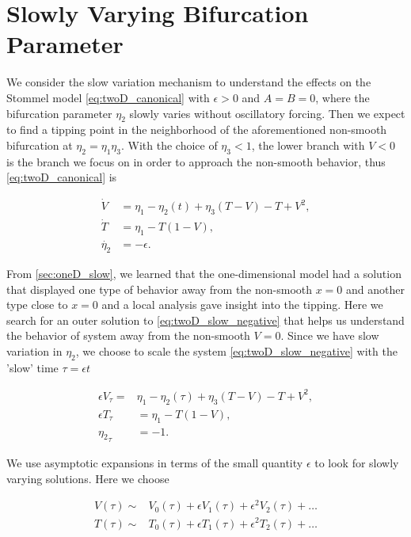 \section{Slowly Varying Bifurcation Parameter}
\label{sec:twoD_slow}

We consider the slow variation mechanism to understand the effects on the Stommel model \eqref{eq:twoD_canonical} with $\epsilon>0$ and $A=B=0$, where the bifurcation parameter $\eta_2$ slowly varies without oscillatory forcing. Then we expect to find a tipping point in the neighborhood of the aforementioned non-smooth bifurcation at $\eta_2=\eta_1\eta_3$. With the choice of $\eta_3<1$, the lower branch with $V<0$ is the branch we focus on in order to approach the non-smooth behavior, thus \eqref{eq:twoD_canonical} is

\begin{equation}\label{eq:twoD_slow_negative}
 \begin{aligned}
   \dot{V} & =  \eta_1-\eta_2(t)+\eta_3(T-V)-T+V^2, \\
   \dot{T} & =  \eta_1-T(1-V),  \\
  \dot{\eta_2}  & =  -\epsilon.
  \end{aligned}
\end{equation}

From \autoref{sec:oneD_slow}, we learned that the one-dimensional model had a solution that displayed one type of behavior away from the non-smooth $x=0$ and another type close to $x=0$ and a local analysis gave insight into the tipping. Here we search for an outer solution to \eqref{eq:twoD_slow_negative} that helps us understand the behavior of system away from the non-smooth $V=0$.  Since we have slow variation in $\eta_2$, we choose to scale the system \eqref{eq:twoD_slow_negative} with the 'slow' time $\tau=\epsilon t$

\begin{equation}\label{eq:twoD_slow_slowsystem}
\begin{aligned}
\epsilon V_\tau =&\eta_1-\eta_2(\tau)+\eta_3(T-V)-T+V^2, \\
\epsilon T_\tau & =  \eta_1-T(1-V),  \\
  {\eta_2}_\tau  & =  -1.
\end{aligned}
\end{equation}

We use asymptotic expansions in terms of the small quantity $\epsilon$ to look for slowly varying solutions. Here we choose

\begin{equation}\label{eq:twoD_slow_outerexpansion}
\begin{aligned}
V(\tau)\sim &V_0(\tau)+\epsilon V_1(\tau)+\epsilon^2 V_2(\tau)+\ldots\\
T(\tau)\sim & T_0(\tau)+\epsilon T_1(\tau)+\epsilon^2 T_2(\tau)+\ldots
\end{aligned}
\end{equation}


